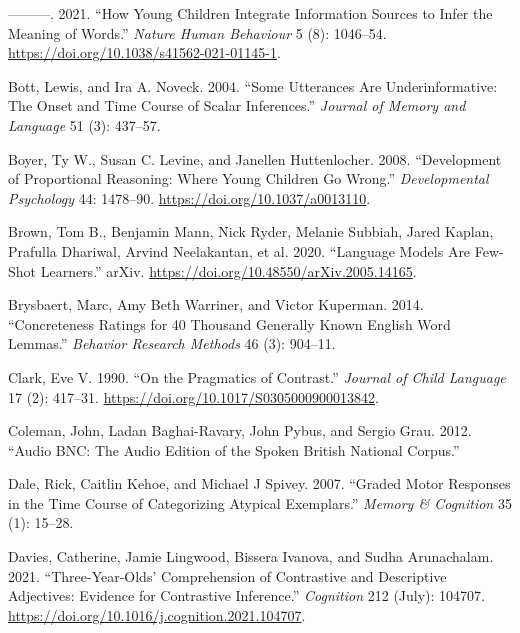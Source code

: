 \documentclass{ucetd}
\newlength{\cslhangindent}
\newenvironment{cslreferences}%
{\setlength{\parindent}{0pt}%
\everypar{\setlength{\hangindent}{\cslhangindent}}\ignorespaces}%
{\par}
\begin{document}
\begin{cslreferences}
\leavevmode\hypertarget{ref-bohn_how_2021}{}%
---------. 2021. ``How Young Children Integrate Information Sources to
Infer the Meaning of Words.'' \emph{Nature Human Behaviour} 5 (8):
1046--54. \url{https://doi.org/10.1038/s41562-021-01145-1}.

\leavevmode\hypertarget{ref-bott_utterances_2004}{}%
Bott, Lewis, and Ira A. Noveck. 2004. ``Some Utterances Are
Underinformative: The Onset and Time Course of Scalar Inferences.''
\emph{Journal of Memory and Language} 51 (3): 437--57.

\leavevmode\hypertarget{ref-boyer_development_2008}{}%
Boyer, Ty W., Susan C. Levine, and Janellen Huttenlocher. 2008.
``Development of Proportional Reasoning: Where Young Children Go
Wrong.'' \emph{Developmental Psychology} 44: 1478--90.
\url{https://doi.org/10.1037/a0013110}.

\leavevmode\hypertarget{ref-brown_language_2020}{}%
Brown, Tom B., Benjamin Mann, Nick Ryder, Melanie Subbiah, Jared Kaplan,
Prafulla Dhariwal, Arvind Neelakantan, et al. 2020. ``Language Models
Are Few-Shot Learners.'' arXiv.
\url{https://doi.org/10.48550/arXiv.2005.14165}.

\leavevmode\hypertarget{ref-brysbaert2014}{}%
Brysbaert, Marc, Amy Beth Warriner, and Victor Kuperman. 2014.
``Concreteness Ratings for 40 Thousand Generally Known English Word
Lemmas.'' \emph{Behavior Research Methods} 46 (3): 904--11.

\leavevmode\hypertarget{ref-clark_pragmatics_1990}{}%
Clark, Eve V. 1990. ``On the Pragmatics of Contrast.'' \emph{Journal of
Child Language} 17 (2): 417--31.
\url{https://doi.org/10.1017/S0305000900013842}.

\leavevmode\hypertarget{ref-coleman_audio_2012}{}%
Coleman, John, Ladan Baghai-Ravary, John Pybus, and Sergio Grau. 2012.
``Audio BNC: The Audio Edition of the Spoken British National Corpus.''

\leavevmode\hypertarget{ref-dale_graded_2007}{}%
Dale, Rick, Caitlin Kehoe, and Michael J Spivey. 2007. ``Graded Motor
Responses in the Time Course of Categorizing Atypical Exemplars.''
\emph{Memory \& Cognition} 35 (1): 15--28.

\leavevmode\hypertarget{ref-davies_three-year-olds_2021}{}%
Davies, Catherine, Jamie Lingwood, Bissera Ivanova, and Sudha
Arunachalam. 2021. ``Three-Year-Olds' Comprehension of Contrastive and
Descriptive Adjectives: Evidence for Contrastive Inference.''
\emph{Cognition} 212 (July): 104707.
\url{https://doi.org/10.1016/j.cognition.2021.104707}.


\end{cslreferences}
\end{document}
